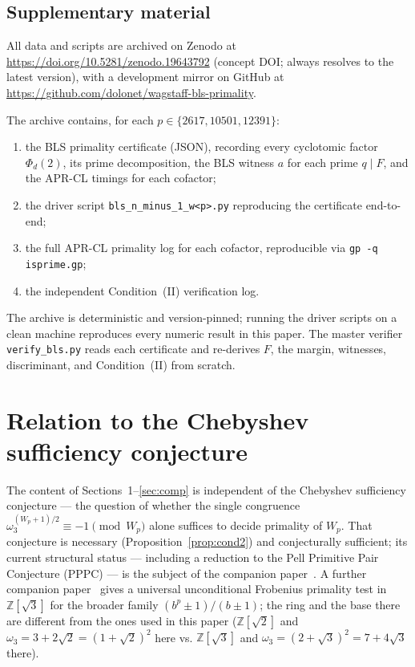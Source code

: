 \documentclass[11pt,a4paper]{amsart}
\theoremstyle{plain}
\theoremstyle{definition}
\newcommand{\Z}{\mathbb{Z}}
\newcommand{\wom}{\omega_3}
\newcommand{\sqrttwo}{\sqrt{2}}
\begin{document}
\subsection{Supplementary material}

All data and scripts are archived on Zenodo at
\url{https://doi.org/10.5281/zenodo.19643792} (concept DOI; always
resolves to the latest version), with a development mirror on GitHub
at \url{https://github.com/dolonet/wagstaff-bls-primality}.

The archive contains, for each $p \in \{2617, 10501, 12391\}$:

\begin{enumerate}
\item the BLS primality certificate (JSON), recording every
  cyclotomic factor $\Phi_d(2)$, its prime decomposition, the BLS
  witness $a$ for each prime $q \mid F$, and the APR-CL timings for
  each cofactor;
\item the driver script \texttt{bls\_n\_minus\_1\_w<p>.py}
  reproducing the certificate end-to-end;
\item the full APR-CL primality log for each cofactor, reproducible
  via \texttt{gp -q isprime.gp};
\item the independent Condition~(II) verification log.
\end{enumerate}

The archive is deterministic and version-pinned; running the driver
scripts on a clean machine reproduces every numeric result in this
paper. The master verifier \texttt{verify\_bls.py} reads each
certificate and re-derives $F$, the margin, witnesses, discriminant,
and Condition~(II) from scratch.

\section{Relation to the Chebyshev sufficiency conjecture}

The content of Sections~1--\ref{sec:comp} is independent of the
Chebyshev sufficiency conjecture --- the question of whether the
single congruence $\wom^{(W_p + 1)/2} \equiv -1 \pmod{W_p}$ alone
suffices to decide primality of $W_p$. That conjecture is necessary
(Proposition~\ref{prop:cond2}) and conjecturally sufficient; its
current structural status --- including a reduction to the Pell
Primitive Pair Conjecture (PPPC) --- is the subject of the companion
paper~\cite{PaperB}. A further companion paper~\cite{PaperD3} gives a
universal unconditional Frobenius primality test in $\Z[\sqrt 3]$ for
the broader family $(b^p \pm 1)/(b \pm 1)$; the ring and the base
there are different from the ones used in this paper
($\Z[\sqrttwo]$ and $\wom = 3 + 2\sqrttwo = (1 + \sqrttwo)^2$ here
vs. $\Z[\sqrt 3]$ and $\omega_3 = (2 + \sqrt 3)^2 = 7 + 4\sqrt 3$
there).
\end{document}

